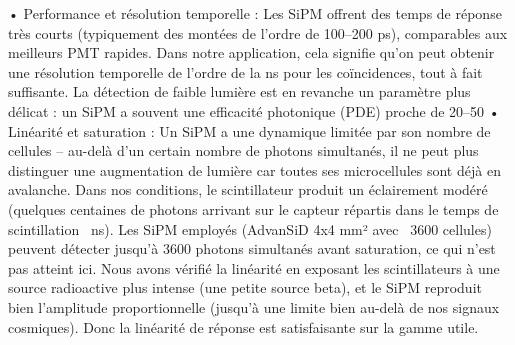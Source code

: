 \documentclass[a4paper,12pt,twoside]{article}
\begin{document}
	•	Performance et résolution temporelle : Les SiPM offrent des temps de réponse très courts (typiquement des montées de l’ordre de 100–200 ps), comparables aux meilleurs PMT rapides. Dans notre application, cela signifie qu’on peut obtenir une résolution temporelle de l’ordre de la ns pour les coïncidences, tout à fait suffisante. La détection de faible lumière est en revanche un paramètre plus délicat : un SiPM a souvent une efficacité photonique (PDE) proche de 20–50%
	•	Linéarité et saturation : Un SiPM a une dynamique limitée par son nombre de cellules – au-delà d’un certain nombre de photons simultanés, il ne peut plus distinguer une augmentation de lumière car toutes ses microcellules sont déjà en avalanche. Dans nos conditions, le scintillateur produit un éclairement modéré (quelques centaines de photons arrivant sur le capteur répartis dans le temps de scintillation ~ns). Les SiPM employés (AdvanSiD 4x4 mm² avec ~3600 cellules) peuvent détecter jusqu’à 3600 photons simultanés avant saturation, ce qui n’est pas atteint ici. Nous avons vérifié la linéarité en exposant les scintillateurs à une source radioactive plus intense (une petite source beta), et le SiPM reproduit bien l’amplitude proportionnelle (jusqu’à une limite bien au-delà de nos signaux cosmiques). Donc la linéarité de réponse est satisfaisante sur la gamme utile.
\end{document}
